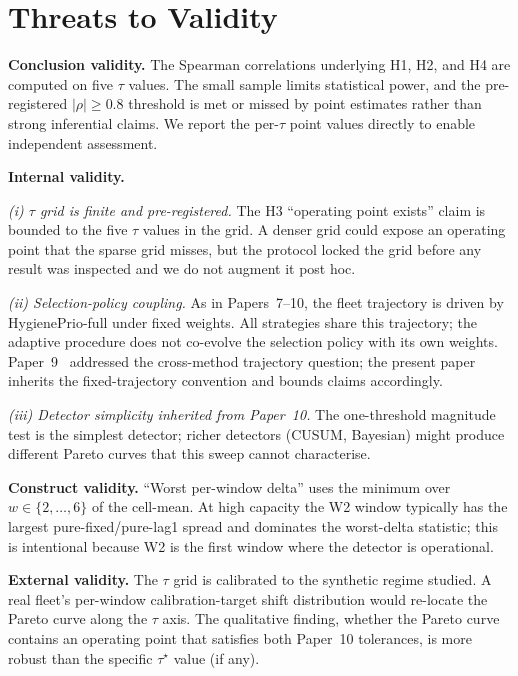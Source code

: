 \section{Threats to Validity}
\label{sec:threats}

\textbf{Conclusion validity.} The Spearman correlations underlying
H1, H2, and H4 are computed on five $\tau$ values. The small sample
limits statistical power, and the pre-registered $|\rho| \geq 0.8$
threshold is met or missed by point estimates rather than strong
inferential claims. We report the per-$\tau$ point values directly
to enable independent assessment.

\textbf{Internal validity.}

\textit{(i) $\tau$ grid is finite and pre-registered.} The H3
``operating point exists'' claim is bounded to the five $\tau$ values
in the grid. A denser grid could expose an operating point that the
sparse grid misses, but the protocol locked the grid before any
result was inspected and we do not augment it post hoc.

\textit{(ii) Selection-policy coupling.} As in Papers~7--10, the
fleet trajectory is driven by HygienePrio-full under \textsf{fixed}
weights. All strategies share this trajectory; the adaptive
procedure does not co-evolve the selection policy with its own
weights. Paper~9~\cite{paper9selftraj} addressed the cross-method
trajectory question; the present paper inherits the fixed-trajectory
convention and bounds claims accordingly.

\textit{(iii) Detector simplicity inherited from Paper~10.} The
one-threshold magnitude test is the simplest detector; richer
detectors (CUSUM, Bayesian) might produce different Pareto curves
that this sweep cannot characterise.

\textbf{Construct validity.} ``Worst per-window delta'' uses the
minimum over $w \in \{2, \ldots, 6\}$ of the cell-mean. At high
capacity the W2 window typically has the largest pure-fixed/pure-lag1
spread and dominates the worst-delta statistic; this is intentional
because W2 is the first window where the detector is operational.

\textbf{External validity.} The $\tau$ grid is calibrated to the
synthetic regime studied. A real fleet's per-window calibration-target
shift distribution would re-locate the Pareto curve along the
$\tau$ axis. The qualitative finding, whether the Pareto curve
contains an operating point that satisfies both Paper~10 tolerances, 
is more robust than the specific $\tau^\star$ value (if any).
